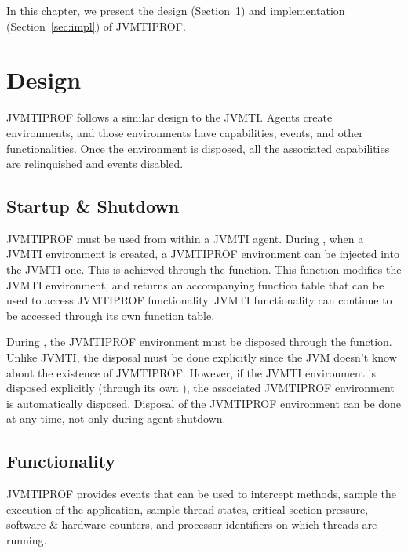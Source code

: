 

In this chapter, we present the design (Section~\ref{sec:design}) and implementation (Section~\ref{sec:impl}) of JVMTIPROF.

\section{Design} \label{sec:design}

JVMTIPROF follows a similar design to the JVMTI. Agents create environments, and those environments have capabilities, events, and other functionalities. Once the environment is disposed, all the associated capabilities are relinquished and events disabled.

\subsection{Startup \& Shutdown}

JVMTIPROF must be used from within a JVMTI agent. During , when a JVMTI environment is created, a JVMTIPROF environment can be injected into the JVMTI one. This is achieved through the  function. This function modifies the JVMTI environment, and returns an accompanying function table that can be used to access JVMTIPROF functionality. JVMTI functionality can continue to be accessed through its own function table.

During , the JVMTIPROF environment must be disposed through the  function. Unlike JVMTI, the disposal must be done explicitly since the JVM doesn't know about the existence of JVMTIPROF. However, if the JVMTI environment is disposed explicitly (through its own ), the associated JVMTIPROF environment is automatically disposed. Disposal of the JVMTIPROF environment can be done at any time, not only during agent shutdown.

\subsection{Functionality}

JVMTIPROF provides events that can be used to intercept methods, sample the execution of the application, sample thread states, critical section pressure, software \& hardware counters, and processor identifiers on which threads are running.

